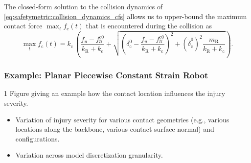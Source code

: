 The closed-form solution to the collision dynamics of \eqref{eq:safetymetric:collision_dynamics_cfs} allows us to upper-bound the maximum contact force $\max_t f_\mathrm{c}(t)$ that is encountered during the collision as
\begin{equation}
     \max_{t}f_\mathrm{c}(t) = k_\mathrm{c} \, \left ( \frac{f_u-f_\mathcal{U}^{\mathrm{c0}}}{k_\mathrm{R} + k_\mathrm{c}} + \sqrt{\left ( \delta_\mathrm{c}^0 - \frac{f_u-f_\mathcal{U}^{\mathrm{c0}}}{k_\mathrm{R} + k_\mathrm{c}} \right )^2 + \left (\dot{\delta}_\mathrm{c}^0 \right )^2 \frac{m_\mathrm{R}}{k_\mathrm{R} + k_\mathrm{c}} } \right ).
\end{equation}


\subsubsection{Example: Planar Piecewise Constant Strain Robot}
1 Figure giving an example how the contact location influences the injury severity.
\begin{itemize}
    \item Variation of injury severity for various contact geometries (e.g., various locations along the backbone, various contact surface normal) and configurations.
    \item Variation across model discretization granularity.
\end{itemize}

